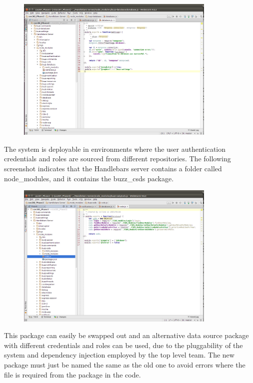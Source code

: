 \documentclass[hidelinks, 12pt, oneside]{article}
\begin{document}
\begin{enumerate}
\begin{figure}[h!]
  \centering
    \includegraphics[width=0.85\textwidth]{databaseCurrent} 
\end{figure}

The system is deployable in environments where the user authentication credentials and roles are sourced from different repositories. The following screenshot indicates that the Handlebars server contains a folder called node\_modules, and it contains the buzz\_csds package. 


\begin{figure}[h!]
  \centering
    \includegraphics[width=0.85\textwidth]{CSDSPackage} 
\end{figure}
 
This package can easily be swapped out and an alternative data source package with different credentials and roles can be used, due to the pluggability of the system and dependency injection employed by the top level team. The new package must just be named the same as the old one to avoid errors where the file is required from the package in the code. 

\end{enumerate}
\end{document}
